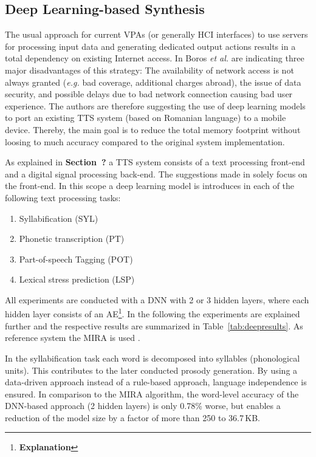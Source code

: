 \subsection{Deep Learning-based Synthesis}
\label{subsec:deepembedded}

The usual approach for current \acp{VPA} (or generally \ac{HCI} interfaces) to use servers for processing input data and generating dedicated output actions results in a total dependency on existing Internet access. In \cite{boros:robust} Boros \textit{et al.} are indicating three major disadvantages of this strategy: The availability of network access is not always granted (\textit{e.g.} bad coverage, additional charges abroad), the issue of data security, and possible delays due to bad network connection causing bad user experience. The authors are therefore suggesting the use of deep learning models to port an existing \ac{TTS} system (based on Romanian language) to a mobile device. Thereby, the main goal is to reduce the total memory footprint without loosing to much accuracy compared to the original system implementation.

As explained in \textbf{\color{ACMRed}Section~?} a \ac{TTS} system consists of a text processing front-end and a digital signal processing back-end. The suggestions made in \cite{boros:robust} solely focus on the front-end. In this scope a deep learning model is introduces in each of the following text processing tasks:

\begin{enumerate}[label=\arabic*.]		%
	\parskip0.25em
	\bfseries
	\item Syllabification (SYL)
	\item Phonetic transcription (PT)
	\item Part-of-speech Tagging (POT)
	\item Lexical stress prediction (LSP)
\end{enumerate}

All experiments are conducted with a \ac{DNN} with 2 or 3 hidden layers, where each hidden layer consists of an \ac{AE}\footnote{\textbf{\color{ACMRed}Explanation}}. In the following the experiments are explained further and the respective results are summarized in Table~\ref{tab:deepresults}. As reference system the \ac{MIRA} is used \cite{boros:mira}.

In the syllabification task each word is decomposed into syllables (phonological units). This contributes to the later conducted prosody generation. By using a data-driven approach instead of a rule-based approach, language independence is ensured. In comparison to the \ac{MIRA} algorithm, the word-level accuracy of the \ac{DNN}-based approach (2 hidden layers) is only 0.78\% worse, but enables a reduction of the model size by a factor of more than 250 to 36.7\,KB.

